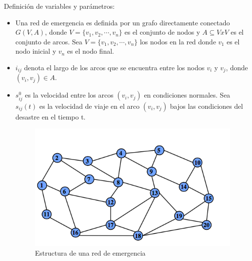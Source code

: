 \documentclass[letter, 10pt]{article}
\begin{document}
Definición de variables y parámetros:
\begin{itemize}
	\item Una red de emergencia es definida por un grafo directamente conectado $G(V,A)$, donde $V=\{v_1,v_2,\cdots, v_n\}$ es el conjunto de nodos y $A\subseteq V x V$ es el conjunto de arcos. Sea $V=\{v_1,v_2,\cdots, v_n\}$ los nodos en la red donde $v_1$ es el nodo inicial y $v_n$ es el nodo final.
	\item $i_{ij}$ denota el largo de los arcos que se encuentra entre los nodos $v_i$ y $v_j$, donde $(v_i,v_j) \in A$.
	\item $s_{ij}^0$ es la velocidad entre los arcos $(v_i,v_j)$ en condiciones normales. Sea $s_{ij}(t)$ es la velocidad de viaje en el arco $(v_i,v_j)$ bajos las condiciones del desastre en el tiempo t.\\

\begin{figure}[h]
\centering
\includegraphics[scale=0.5]{images/routes.png}
\caption{Estructura de una red de emergencia}
\end{figure}
	

\end{itemize}
\end{document}
